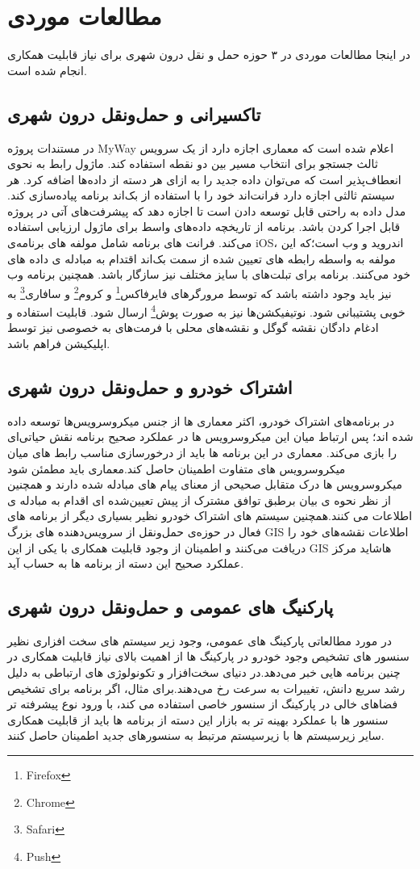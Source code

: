 \section{مطالعات موردی}
در اینجا مطالعات موردی در ۳ حوزه حمل و نقل درون شهری برای نیاز قابلیت همکاری انجام شده است. 

\subsection{تاکسیرانی و حمل‌و‌نقل درون شهری}

در مستندات پروژه MyWay اعلام شده است که معماری اجازه دارد از یک سرویس ثالث جستجو برای انتخاب مسیر بین دو نقطه استفاده کند. ماژول رابط به نحوی انعطاف‌پذیر است که می‌توان داده جدید را به ازای هر دسته از داده‌ها اضافه کرد. هر سیستم ثالثی اجازه دارد فرانت‌اند خود را با استفاده از بک‌اند برنامه پیاده‌سازی کند. مدل داده به راحتی قابل توسعه دادن است تا اجازه دهد که پیشرفت‌های آتی در پروژه قابل اجرا کردن باشد. برنامه از تاریخچه داده‌های واسط برای ماژول ارزیابی استفاده می‌کند. فرانت های برنامه شامل مولفه های برنامه‌ی iOS، اندروید و وب است؛که این مولفه به واسطه رابطه های تعیین شده از سمت بک‌اند اقتدام به مبادله ی داده های خود می‌کنند. برنامه برای تبلت‌های با سایز مختلف نیز سازگار باشد. همچنین برنامه وب نیز باید وجود داشته باشد که توسط مرورگرهای فایرفاکس\footnote{Firefox} و کروم\footnote{Chrome} و سافاری\footnote{Safari} به خوبی پشتیبانی شود.
نوتیفیکشن‌ها نیز به صورت پوش\footnote{Push} ارسال شود.
قابلیت استفاده و ادغام دادگان نقشه گوگل و نقشه‌های محلی با فرمت‌های به خصوصی نیز توسط اپلیکیشن فراهم باشد.


\subsection{اشتراک خودرو و حمل‌و‌نقل درون شهری}
در برنامه‌ها‌ی اشتراک خودرو، اکثر معماری ها از جنس میکروسرویس‌ها توسعه داده شده اند؛ پس ارتباط میان این میکروسرویس ها در عملکرد صحیح برنامه نقش حیاتی‌ای را بازی می‌کند. معماری در این برنامه ها باید از درخورسازی مناسب رابط های میان میکروسرویس های متفاوت اطمینان حاصل کند.معماری باید مطمئن شود میکروسرویس ها درک متقابل صحیحی از معنای پیام های مبادله شده دارند و همچنین از نظر نحوه ی بیان برطبق توافق مشترک از پیش تعیین‌شده ای اقدام به مبادله ی اطلاعات می کنند.همچنین سیستم های اشتراک خودرو نظیر بسیاری دیگر از برنامه های فعال در حوزه‌ی حمل‌و‌نقل از سرویس‌دهنده های بزرگ‌ GIS اطلاعات نقشه‌های خود را دریافت می‌کنند و اطمینان از وجود قابلیت همکاری با یکی از این GIS هاشاید مرکز عملکرد صحیح این دسته از برنامه ها به حساب آید.

\subsection{پارکنیگ های عمومی و حمل‌و‌نقل درون شهری}
در مورد مطالعاتی پارکینگ های عمومی، وجود زیر سیستم های سخت افزاری نظیر سنسور های تشخیص وجود خودرو در پارکینگ ها از اهمیت بالای نیاز قابلیت همکاری در چنین برنامه هایی خبر می‌دهد.در دنیای سخت‌افزار و تکونولوژی های ارتباطی به دلیل رشد سریع دانش، تغییرات به سرعت رخ می‌دهند.برای مثال، اگر برنامه برای تشخیص فضا‌های خالی در پارکینگ از سنسور خاصی استفاده می کند، با ورود نوع پیشرفته تر سنسور ها با عملکرد بهینه تر به بازار این دسته از برنامه ها باید از قابلیت همکاری سایر زیر‌سیستم ها با زیرسیستم مرتبط به سنسور‌های جدید اطمینان حاصل کنند.